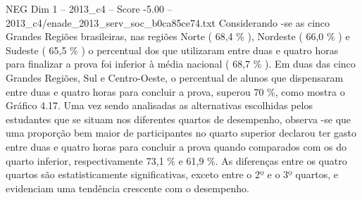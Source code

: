 \begin{textsample}{NEG Dim 1 – 2013\_c4 – Score -5.00 – 2013\_c4/enade\_2013\_serv\_soc\_b0ca85ce74.txt}
Considerando -se as cinco Grandes Regiões brasileiras, nas regiões Norte ( 68,4 \% ), Nordeste ( 66,0 \% ) e Sudeste ( 65,5 \% ) o percentual dos que utilizaram entre duas e quatro horas para finalizar a prova foi inferior à média nacional ( 68,7 \% ).
Em duas das cinco Grandes Regiões, Sul e Centro-Oeste, o percentual de alunos que dispensaram entre duas e quatro horas para concluir a prova, superou 70 \%, como mostra o Gráfico 4.17.
Uma vez sendo analisadas as alternativas escolhidas pelos estudantes que se situam nos diferentes quartos de desempenho, observa -se que uma proporção bem maior de participantes no quarto superior declarou ter gasto entre duas e quatro horas para concluir a prova quando comparados com os do quarto inferior, respectivamente 73,1 \% e 61,9 \%.
As diferenças entre os quatro quartos são estatisticamente significativas, exceto entre o 2º e o 3º quartos, e evidenciam uma tendência crescente com o desempenho.

\end{textsample}
